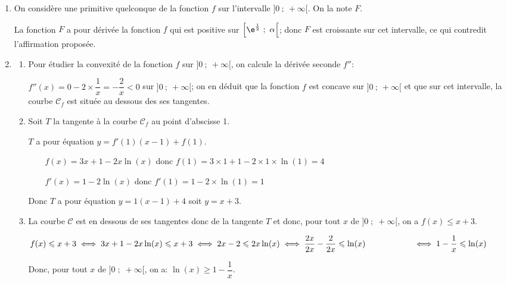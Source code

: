 \begin{enumerate}
\begin{enumerate}
Donc $f(x)>0$ sur $]0\;;\;\alpha[$, $f(\alpha)=0$ et $f(x)<0$ sur $]\alpha\;;\;+\infty[$.
		
		
	\end{enumerate}	
\item On considère une primitive quelconque de la fonction $f$ sur
l'intervalle $]0~;~+\infty[$. On la note $F$.


La fonction $F$ a pour dérivée la fonction $f$ qui est positive sur $\left[\e^{\frac12}~;~\alpha\right[$; donc $F$ est croissante sur cet intervalle, ce qui contredit l'affirmation proposée.
\item
	\begin{enumerate}
		\item Pour étudier la convexité de la fonction $f$ sur $]0~;~+\infty[$, on calcule la dérivée seconde $f''$:
		
$f''(x)=0-2\times \dfrac{1}{x}=-\dfrac{2}{x}<0$ sur $]0~;~+\infty[$; on en déduit que la fonction $f$ est concave sur $]0~;~+\infty[$ et que sur cet intervalle,  la courbe $\mathcal{C}_f$ est située au dessous des ses tangentes.
		\item Soit $T$ la tangente à la courbe $\mathcal{C}_f$ au point d'abscisse 1.

$T$ a pour équation $y=f'(1)\left (x-1\right ) + f(1)$.

~~\textbullet~~$f(x)=3x+1-2x\ln(x)$ donc $f(1)=3\times 1 +1 -2\times 1 \times \ln(1)=4$

~~\textbullet~~$f'(x)=1-2\ln(x)$ donc $f'(1)=1-2\times\ln(1)=1$

Donc $T$ a pour équation $y=1\left (x-1\right ) +4$ soit $y=x+3$.
		
		\item %
La courbe $\mathcal{C}$ est en dessous de ses tangentes donc de la tangente $T$ et donc, pour tout $x$ de $]0\;;\;+\infty[$, on a $f(x)\leqslant x+3$.

$f(x)\leqslant x+3
\iff 3x+1-2x\ln(x) \leqslant x+3
\iff 2x-2 \leqslant 2x\ln(x)
\iff \dfrac{2x}{2x} - \dfrac{2}{2x} \leqslant \ln(x)\\
\phantom{f(x)\leqslant x+3}
\iff 1-\dfrac{1}{x} \leqslant \ln(x)$

Donc, pour tout  $x$ de $]0\;;\;+\infty[$, on a: $\ln(x)\geqslant 1-\dfrac{1}{x}$.
		
	\end{enumerate}
\end{enumerate}

\bigskip

